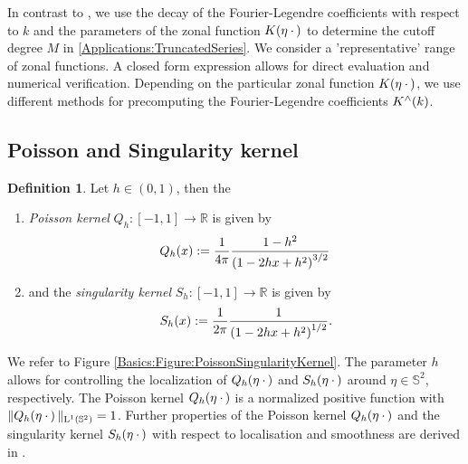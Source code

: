 \documentclass[11pt,a4paper,twoside,bibtotoc]{scrartcl}
\theoremstyle{plain}
\theoremstyle{definition}
\newtheorem{definition}[theorem]{Definition}
\theoremstyle{remark}
\newcommand{\R}{\ensuremath{\mathbb{R}}}
\newcommand{\twosphere}{\ensuremath{\mathbb{S}^2}}
\newcommand{\Ln}[2]{\ensuremath{\text{\rm{L}}^{#1}\left(#2\right)}}
\newcommand{\interv}[4]{\ensuremath{\left#1\left.#2,#3\right#4\right.}}
\newcommand{\fun}[2]{\ensuremath{#1{\hspace{-0.4ex}}\left(#2\right)}}
\newcommand{\paren}[1]{\ensuremath{\left(#1\right)}}
\newcommand{\mb}[1]{\mathbf{#1}}
\newcommand{\V}[1]{\mb{#1}}
\numberwithin{equation}{section}
\numberwithin{table}{section}
\numberwithin{figure}{section}
\begin{document}
In contrast to \cite{Sc97,bahu01,CaFi}, we use the decay of the
Fourier-Legendre coefficients with respect to $k$ and the parameters of the
zonal function $\fun{K}{\V{\eta} \: \cdot \,}$ to determine the cutoff degree
$M$ in \eqref{Applications:TruncatedSeries}.
We consider a 'representative' range of zonal functions. A closed form expression
allows for direct evaluation and numerical verification. Depending on the 
particular zonal function $\fun{K}{\V{\eta} \: \cdot \,}$, we use different 
methods for precomputing the Fourier-Legendre coefficients $\fun{K^{\wedge}}{k}$.

\subsection{Poisson and Singularity kernel}
\begin{definition}\label{def:poisson_sing}
  Let $h \in \interv{(}{0}{1}{)}$, then the
  \begin{enumerate}
  \item \emph{Poisson kernel}
    $Q_{h}:\interv{[}{-1}{1}{]} \rightarrow \R$ is given by
    \[
    \fun{Q_{h}}{x} := \frac{1}{4\pi} \frac{1-h^2}{\paren{1-2hx+h^2}^{3/2}}\,
    \]
  \item and the \emph{singularity kernel}
    $S_{h}:\interv{[}{-1}{1}{]} \rightarrow \R$ is given by
    \[
    \fun{S_{h}}{x} := \frac{1}{2\pi} \frac{1}{\paren{1-2hx+h^2}^{1/2}}.
    \]
  \end{enumerate}
\end{definition}

We refer to Figure \ref{Basics:Figure:PoissonSingularityKernel}. The parameter 
$h$ allows for controlling the localization of 
$\fun{Q_{h}}{\V{\eta} \: \cdot \,}$ and $\fun{S_{h}}{\V{\eta} \: \cdot \,}$ 
around $\eta \in \twosphere$, respectively.
The Poisson kernel $\fun{Q_{h}}{\V{\eta} \: \cdot \,}$ is a normalized positive function with
$\|\fun{Q_{h}}{\V{\eta} \: \cdot \,}\|_{\Ln{1}{\twosphere}}=1$.
Further properties of the Poisson kernel $\fun{Q_{h}}{\V{\eta} \: \cdot \,}$ and the 
singularity kernel $\fun{S_{h}}{\V{\eta} \: \cdot \,}$
with respect to localisation and smoothness are derived
in \cite[pp. 112]{frgesc}.
\end{document}
